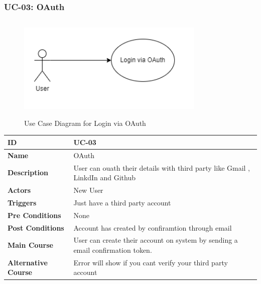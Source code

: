 \subsubsection{UC-03: OAuth}
\begin{figure}[H]
    \includegraphics[height=5cm, width=0.8\textwidth]{./diagrams/Use Case/u3.png}
    \centering
    \caption{Use Case Diagram for Login via OAuth}
    \label{Usecase1}
\end{figure}

\begin{center}
    \begin{tabularx}{\textwidth}{|l|X|}
        \hline
        \textbf{ID}                 & UC-03                                                                          \\
        \hline
        \textbf{Name}               & OAuth                                                                          \\
        \hline
        \textbf{Description}        & User can ouath their details with third party like Gmail , LinkdIn and Github  \\
        \hline
        \textbf{Actors}             & New User                                                                       \\
        \hline
        \textbf{Triggers}           & Just have a third party account                                                \\
        \hline
        \textbf{Pre Conditions}     & None                                                                           \\
        \hline
        \textbf{Post Conditions}    & Account has created by confiramtion through email                              \\
        \hline
        \textbf{Main Course}        & User can create their account on system by sending a email confirmation token. \\
        \hline
        \textbf{Alternative Course} & Error will show if you cant verify your third party account                    \\
        \hline
    \end{tabularx}
\end{center}
\newpage


